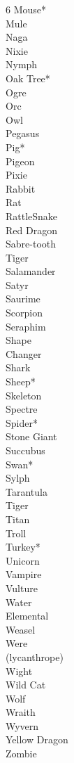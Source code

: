 \begin{multicols}{6}
Mouse* \\
Mule \\
Naga \\
Nixie \\
Nymph \\
Oak Tree* \\
Ogre \\
Orc \\
Owl \\
Pegasus \\
Pig* \\
Pigeon \\
Pixie \\
Rabbit \\
Rat \\
RattleSnake \\
Red Dragon \\
Sabre-tooth \\
Tiger \\
Salamander \\
Satyr \\
Saurime \\
Scorpion \\
Seraphim \\
Shape \\
Changer \\
Shark \\
Sheep* \\
Skeleton \\
Spectre \\
Spider* \\
Stone Giant \\
Succubus \\
Swan* \\
Sylph \\
Tarantula \\
Tiger \\
Titan \\
Troll \\
Turkey* \\
Unicorn \\
Vampire \\
Vulture \\
Water \\
Elemental \\
Weasel \\
Were \\
(lycanthrope) \\
Wight \\
Wild Cat \\
Wolf \\
Wraith \\
Wyvern \\
Yellow Dragon \\
Zombie \\
\end{multicols}
